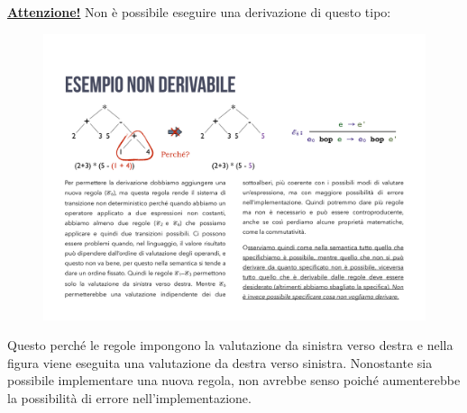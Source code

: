 \documentclass[a4paper]{article}
\begin{document}
	\noindent
	\underline{\textbf{Attenzione!}} Non è possibile eseguire una derivazione di questo tipo:
	\begin{figure}[!htp]
		\centering
		\includegraphics[width=\textwidth]{img/esempio_regole_errato.pdf}
	\end{figure}
	
	\noindent
	Questo perché le regole impongono la valutazione da sinistra verso destra e nella figura viene eseguita una valutazione da destra verso sinistra. Nonostante sia possibile implementare una nuova regola, non avrebbe senso poiché aumenterebbe la possibilità di errore nell'implementazione.
	
	\newpage
	
\end{document}
